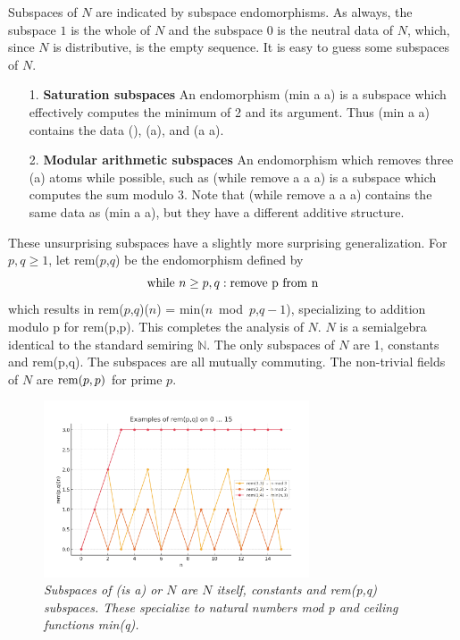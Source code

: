 \documentclass[11pt]{article}
\begin{document}
    Subspaces of $N$ are indicated by subspace endomorphisms.  As always, the subspace $1$ is the whole of $N$ and the subspace $0$ is the neutral data of $N$, which, 
since $N$ is distributive, is the empty sequence.  It is easy to guess some subspaces of $N$.
\begin{itemize} 
\item [1.] {\bf Saturation subspaces} An endomorphism (min a a) is a subspace which effectively computes the minimum of 2 and its argument.  Thus (min a a) contains the data (), (a), and (a a). 
\item [2.] {\bf Modular arithmetic subspaces} An endomorphism which removes three (a) atoms while possible, such as (while remove a a a) is a subspace which computes the sum modulo 3.  Note 
that (while remove a a a) contains the same data as (min a a), but they have a different additive structure.  
\end{itemize}
These unsurprising subspaces have a slightly more surprising generalization.  For $p,q\ge 1$, let rem($p$,$q$) be the endomorphism defined by 
\begin{equation}
{\rm while}\ n\ge p,q: {\rm remove\ p\ from\ n}
\end{equation}
which results in rem($p$,$q$)($n$) = min($n$\ mod\ $p$,$q-1$), specializing to addition modulo p for rem(p,p).  This completes the analysis of $N$.  $N$ is 
a semialgebra identical to the standard semiring $\mathbb N$.  The only subspaces of $N$ are 1, constants and rem(p,q)\cite{rem}.  The subspaces are
all mutually commuting.  The non-trivial fields of $N$ are ${\rm rem}(p,p)$ for prime $p$.  

\begin{figure}[h]
\centering
\includegraphics[width=0.7\textwidth]{rem.png}
\caption{{\it Subspaces of (is a) or $N$ are $N$ itself, constants and rem(p,q) subspaces.  These specialize to natural numbers mod p and ceiling functions min(q).}}
\end{figure}
\end{document}

